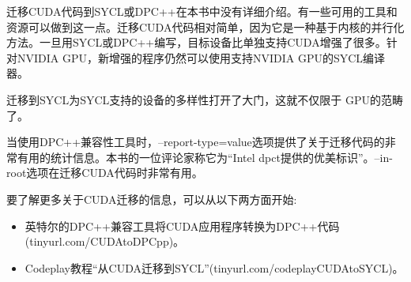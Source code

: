 迁移CUDA代码到SYCL或DPC++在本书中没有详细介绍。有一些可用的工具和资源可以做到这一点。迁移CUDA代码相对简单，因为它是一种基于内核的并行化方法。一旦用SYCL或DPC++编写，目标设备比单独支持CUDA增强了很多。针对NVIDIA GPU，新增强的程序仍然可以使用支持NVIDIA GPU的SYCL编译器。\par

迁移到SYCL为SYCL支持的设备的多样性打开了大门，这就不仅限于 GPU的范畴了。\par

当使用DPC++兼容性工具时，--report-type=value选项提供了关于迁移代码的非常有用的统计信息。本书的一位评论家称它为“Intel dpct提供的优美标识”。--in-root选项在迁移CUDA代码时非常有用。\par

要了解更多关于CUDA迁移的信息，可以从以下两方面开始:\par

\begin{itemize}
	\item 英特尔的DPC++兼容工具将CUDA应用程序转换为DPC++代码(tinyurl.com/CUDAtoDPCpp)。
	\item Codeplay教程“从CUDA迁移到SYCL”(tinyurl.com/codeplayCUDAtoSYCL)。
\end{itemize}















